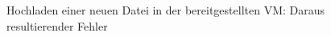 \documentclass[12pt,DIV14,BCOR10mm,a4paper,parskip=half-,headsepline,headinclude,english,ngerman,bibliography=totocnumbered]{scrreprt}
\begin{document}
\begin{appendices}
\begin{figure}[!htb]
  \centering
    \label{upload_fail_1}
    \caption{Hochladen einer neuen Datei in der bereitgestellten VM: Daraus resultierender Fehler}
  \end{figure}

\end{appendices}
\end{document}
